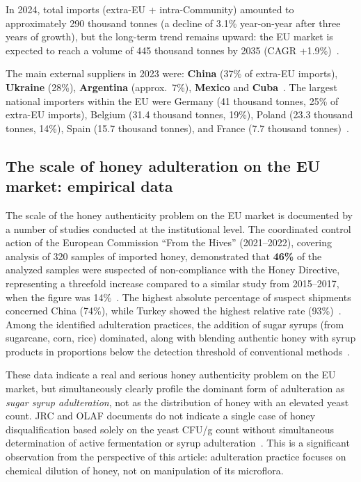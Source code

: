 In 2024, total imports (extra-EU + intra-Community) amounted to
approximately 290 thousand tonnes (a decline of 3.1\% year-on-year
after three years of growth), but the long-term trend remains
upward: the EU market is expected to reach a volume of 445 thousand
tonnes by 2035 (CAGR +1.9\%)~\cite{eurostat_honey2023}.

The main external suppliers in 2023 were:
\textbf{China} (37\% of extra-EU imports), \textbf{Ukraine} (28\%),
\textbf{Argentina} (approx.\ 7\%), \textbf{Mexico} and
\textbf{Cuba}~\cite{tridge2024}.
The largest national importers within the EU were Germany
(41 thousand tonnes, 25\% of extra-EU imports), Belgium
(31.4 thousand tonnes, 19\%), Poland (23.3 thousand tonnes, 14\%),
Spain (15.7 thousand tonnes), and France
(7.7 thousand tonnes)~\cite{eurostat_honey2023}.

\subsection{The scale of honey adulteration on the EU market: empirical data}

The scale of the honey authenticity problem on the EU market is
documented by a number of studies conducted at the institutional
level. The coordinated control action of the European Commission
``From the Hives'' (2021--2022), covering analysis of 320 samples
of imported honey, demonstrated that \textbf{46\%} of the analyzed
samples were suspected of non-compliance with the Honey Directive,
representing a threefold increase compared to a similar study from
2015--2017, when the figure was 14\%~\cite{eufromhives2021}.
The highest absolute percentage of suspect shipments concerned China
(74\%), while Turkey showed the highest relative rate
(93\%)~\cite{eufromhives2021}. Among the identified adulteration
practices, the addition of sugar syrups (from sugarcane, corn, rice)
dominated, along with blending authentic honey with syrup products
in proportions below the detection threshold of conventional
methods~\cite{eufromhives2021,schoder2026}.

These data indicate a real and serious honey authenticity problem
on the EU market, but simultaneously clearly profile the dominant
form of adulteration as \emph{sugar syrup adulteration}, not as
the distribution of honey with an elevated yeast count. JRC and OLAF
documents do not indicate a single case of honey disqualification
based solely on the yeast CFU/g count without simultaneous
determination of active fermentation or syrup
adulteration~\cite{eufromhives2021}. This is a significant
observation from the perspective of this article: adulteration
practice focuses on chemical dilution of honey, not on manipulation
of its microflora.

